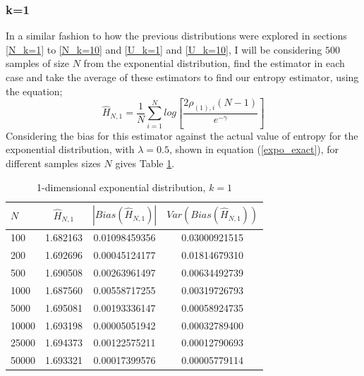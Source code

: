 \documentclass{article}
\begin{document}
\subsubsection{k=1} \label{E_k=1}
In a similar fashion to how the previous distributions were explored in sections \ref{N_k=1} to \ref{N_k=10} and \ref{U_k=1} and \ref{U_k=10}, I will be considering $500$ samples of size $N$ from the exponential distribution, find the estimator in each case and take the average of these estimators to find our entropy estimator, using the equation;
\begin{equation}
\hat{H}_{N, 1} = \frac{1}{N} \sum_{i=1}^{N} log \left[ \frac{2\rho_{(1),i} (N-1)}{e^{-\gamma}} \right] \nonumber
\end{equation}
Considering the bias for this estimator against the actual value of entropy for the exponential distribution, with $\lambda =0.5$, shown in equation (\ref{expo_exact}), for different samples sizes $N$ gives Table \ref{expo_k=1_table}.

\begin{table}
\caption{1-dimensional exponential distribution, $k=1$} \label{expo_k=1_table}
\begin{center}
\begin{tabular}{| l | c c c|} 
\toprule
$N$ & $\hat{H}_{N, 1}$ & $|Bias(\hat{H}_{N, 1})|$ & $Var(Bias(\hat{H}_{N, 1}))$ \\
\midrule[1pt]
100     & 1.682163     & 0.01098459356     & 0.03000921515  \\
200     & 1.692696     & 0.00045124177     & 0.01814679310  \\
500     & 1.690508     & 0.00263961497     & 0.00634492739  \\
1000    & 1.687560     & 0.00558717255     & 0.00319726793  \\
5000    & 1.695081     & 0.00193336147     & 0.00058924735  \\
10000   & 1.693198     & 0.00005051942     & 0.00032789400  \\
25000   & 1.694373     & 0.00122575211     & 0.00012790693  \\
50000   & 1.693321     & 0.00017399576     & 0.00005779114  \\
\hline
\end{tabular}
\end{center}
\end{table}
\end{document}
